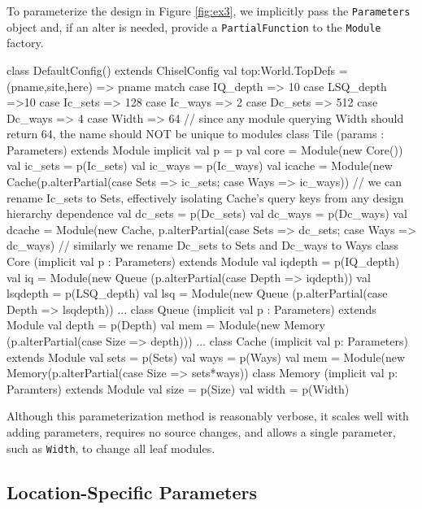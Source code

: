 \documentclass[10pt,twocolumn]{article}
\def\code#1{{\small\tt #1}}
\begin{document}
To parameterize the design in Figure \ref{fig:ex3}, we implicitly pass
the \code{Parameters} object and, if an alter is needed, provide a
\code{PartialFunction} to the \code{Module} factory.
\begin{scala}
class DefaultConfig() extends ChiselConfig {
  val top:World.TopDefs = {
    (pname,site,here) => pname match {
      case IQ_depth => 10
      case LSQ_depth =>10
      case Ic_sets => 128
      case Ic_ways => 2
      case Dc_sets => 512
      case Dc_ways => 4
      case Width => 64
      // since any module querying Width should return 64, the name should NOT be unique to modules
    }
  }
}
class Tile (params : Parameters) extends Module { 
  implicit val p = p
  val core = Module(new Core())
  val ic_sets = p(Ic_sets)
  val ic_ways = p(Ic_ways)
  val icache = Module(new Cache(p.alterPartial({case Sets => ic_sets; case Ways => ic_ways}))
  // we can rename Ic_sets to Sets, effectively isolating Cache's query keys from any design hierarchy dependence
  val dc_sets = p(Dc_sets)
  val dc_ways = p(Dc_ways)
  val dcache = Module(new Cache, p.alterPartial({case Sets => dc_sets; case Ways => dc_ways})
  // similarly we rename Dc_sets to Sets and Dc_ways to Ways
}
class Core (implicit val p : Parameters) extends Module {
  val iqdepth = p(IQ_depth)
  val iq = Module(new Queue (p.alterPartial({case Depth => iqdepth}))
  val lsqdepth = p(LSQ_depth)
  val lsq = Module(new Queue (p.alterPartial({case Depth => lsqdepth}))
  ...
}
class Queue (implicit val p : Parameters) extends Module {
  val depth = p(Depth)
  val mem = Module(new Memory (p.alterPartial({case Size => depth})))
  ...
}
class Cache (implicit val p: Parameters) extends Module {
  val sets = p(Sets)
  val ways = p(Ways)
  val mem = Module(new Memory(p.alterPartial({case Size => sets*ways}))
}
class Memory (implicit val p: Paramters) extends Module {
  val size = p(Size)
  val width = p(Width)
}
\end{scala}

Although this parameterization method is reasonably verbose, it scales well with adding parameters, requires no source changes, and allows a single parameter, such as \code{Width}, to change all leaf modules.

\subsection{Location-Specific Parameters}
\end{document}
